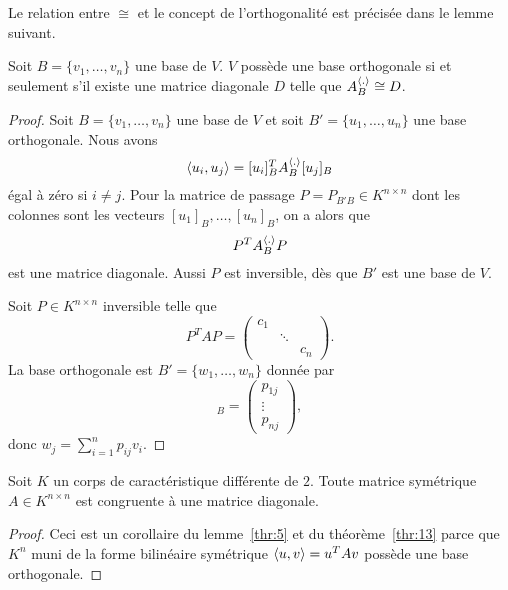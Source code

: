 Le relation entre $\cong$ et le concept de l'orthogonalité   est précisée dans le lemme suivant. 
\begin{lemma}
\label{thr:13}
  Soit $B = \{v_1,\dots,v_n\}$ une base de $V$. $V$ possède une base orthogonale si et seulement s'il existe une matrice diagonale $D$ 
telle que 
 $A_B^{\langle {.} \rangle} \cong D$. 
\end{lemma}
\begin{proof}
  Soit $B = \{v_1,\dots,v_n\}$  une base de $V$ et soit $B' = \{u_1,\dots,u_n\}$ une base orthogonale. 
Nous avons 
\begin{equation}
  \label{eq:8}
  \langle {u_i,u_j} \rangle  =  [u_i]_B^T A_B^{\langle {.} \rangle} {[u_j]_B}
\end{equation}  égal à zéro si $i \neq j$. Pour la matrice de passage $P = P_{B' B} \in K^{n \times n}$ dont les colonnes sont les vecteurs $[u_1]_B,\dots,[u_n]_B$, on a alors que 
\begin{displaymath}
  P^T A_B^{\langle {.} \rangle}P
\end{displaymath}
est une matrice diagonale. Aussi $P$ est inversible, dès que $B'$ est une base de $V$. 


Soit $P \in K^{n\times n} $ inversible telle que
\begin{displaymath}
    P^T A {P} =
    \begin{pmatrix}
      c_1\\
      & \ddots \\
      && c_n
    \end{pmatrix}. 
  \end{displaymath}
  La base orthogonale est $B' = \{w_1,\dots,w_n\}$ donnée par 
  \begin{displaymath}
     [w_j]_B =
  \begin{pmatrix}
    p_{1j}\\ \vdots \\ p_{nj}
  \end{pmatrix},
  \end{displaymath}
donc $w_j = \sum_{i=1}^n p_{ij} v_i$. 
\end{proof}




 

\begin{corollary}
  \label{co:4}
  Soit $K$ un corps de caractéristique différente de $2$. Toute matrice symétrique  $A \in K^{n \times n}$ est congruente à une matrice diagonale. 
\end{corollary}
\begin{proof}
Ceci est un corollaire du  lemme~\ref{thr:5} et du théorème~\ref{thr:13} 
parce que  $K^n$ muni de la forme bilinéaire symétrique $\langle {u,v} \rangle = u^TAv$ possède une base orthogonale. 
\end{proof}

